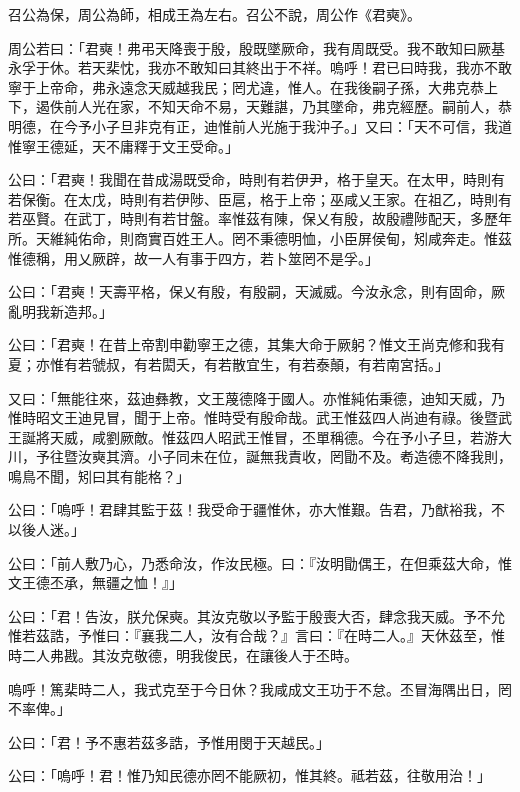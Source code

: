 
\begin{pinyinscope}
召公為保，周公為師，相成王為左右。召公不說，周公作《君奭》。

周公若曰：「君奭！弗弔天降喪于殷，殷既墜厥命，我有周既受。我不敢知曰厥基永孚于休。若天棐忱，我亦不敢知曰其終出于不祥。嗚呼！君已曰時我，我亦不敢寧于上帝命，弗永遠念天威越我民；罔尤違，惟人。在我後嗣子孫，大弗克恭上下，遏佚前人光在家，不知天命不易，天難諶，乃其墜命，弗克經歷。嗣前人，恭明德，在今予小子旦非克有正，迪惟前人光施于我沖子。」又曰：「天不可信，我道惟寧王德延，天不庸釋于文王受命。」

公曰：「君奭！我聞在昔成湯既受命，時則有若伊尹，格于皇天。在太甲，時則有若保衡。在太戊，時則有若伊陟、臣扈，格于上帝；巫咸乂王家。在祖乙，時則有若巫賢。在武丁，時則有若甘盤。率惟茲有陳，保乂有殷，故殷禮陟配天，多歷年所。天維純佑命，則商實百姓王人。罔不秉德明恤，小臣屏侯甸，矧咸奔走。惟茲惟德稱，用乂厥辟，故一人有事于四方，若卜筮罔不是孚。」

公曰：「君奭！天壽平格，保乂有殷，有殷嗣，天滅威。今汝永念，則有固命，厥亂明我新造邦。」

公曰：「君奭！在昔上帝割申勸寧王之德，其集大命于厥躬？惟文王尚克修和我有夏；亦惟有若虢叔，有若閎夭，有若散宜生，有若泰顛，有若南宮括。」

又曰：「無能往來，茲迪彝教，文王蔑德降于國人。亦惟純佑秉德，迪知天威，乃惟時昭文王迪見冒，聞于上帝。惟時受有殷命哉。武王惟茲四人尚迪有祿。後暨武王誕將天威，咸劉厥敵。惟茲四人昭武王惟冒，丕單稱德。今在予小子旦，若游大川，予往暨汝奭其濟。小子同未在位，誕無我責收，罔勖不及。耇造德不降我則，鳴鳥不聞，矧曰其有能格？」

公曰：「嗚呼！君肆其監于茲！我受命于疆惟休，亦大惟艱。告君，乃猷裕我，不以後人迷。」

公曰：「前人敷乃心，乃悉命汝，作汝民極。曰：『汝明勖偶王，在但乘茲大命，惟文王德丕承，無疆之恤！』」

公曰：「君！告汝，朕允保奭。其汝克敬以予監于殷喪大否，肆念我天威。予不允惟若茲誥，予惟曰：『襄我二人，汝有合哉？』言曰：『在時二人。』天休茲至，惟時二人弗戡。其汝克敬德，明我俊民，在讓後人于丕時。

嗚呼！篤棐時二人，我式克至于今日休？我咸成文王功于不怠。丕冒海隅出日，罔不率俾。」

公曰：「君！予不惠若茲多誥，予惟用閔于天越民。」

公曰：「嗚呼！君！惟乃知民德亦罔不能厥初，惟其終。祗若茲，往敬用治！」


\end{pinyinscope}